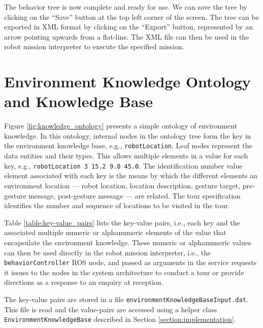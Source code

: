 \documentclass{CSSRforAfrica}
\begin{document}
The behavior tree is now complete and ready for use. We can save the tree by clicking on the ``Save'' button at the top left corner of the screen. The tree can be exported in XML format by clicking on the ``Export'' button, represented by an arrow pointing upwards from a flat-line. The XML file can then be used in the robot mission interpreter to execute the specified mission.



\newpage

\section{Environment Knowledge Ontology and Knowledge Base}
\label{section:knowledge_base}

Figure \ref{fig:knowledge_ontology} presents a simple ontology of environment knowledge.
In this ontology, internal nodes in the ontology tree form the key in the environment knowledge base, e.g., {\small \tt robotLocation}.  Leaf nodes represent the data entities and their types.  This allows  multiple elements in a value for each key, e.g., {\small \tt robotLocation 3 15.2 9.0 45.0}.  The identification number value element associated with each key is the means by which the different elements an environment location ---  robot location,  location description,  gesture target,  pre-gesture message,  post-gesture message --- are related.  The tour specification identifies the number and sequence of locations to be visited in the tour.




Table \ref{table:key-value_pairs} lists the key-value pairs, i.e., each key and the associated multiple numeric or alphanumeric elements of the value that encapsulate the environment knowledge.  These numeric or alphanumeric values can then be used directly in the robot mission interpreter, i.e., the {\small \tt behaviorController} ROS node, and passed as arguments in the service requests it issues to the nodes in the system architecture to conduct a tour or provide directions as a response to an enquiry at reception.

The key-value pairs are stored in a file {\tt \small environmentKnowledgeBaseInput.dat}. This file is read and the value-pairs are accessed using a helper class {\tt \small EnvironmentKnowledgeBase} described in Section \ref{section:implementation}.  
 
\end{document}

